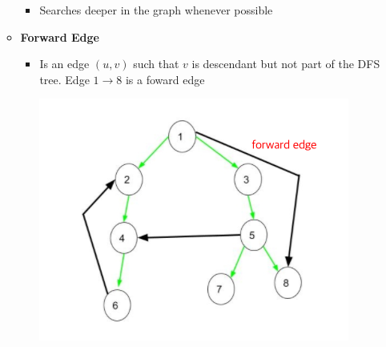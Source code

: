 \documentclass[12pt]{article}
\begin{document}
\begin{enumerate}[1.]
\begin{itemize}
        \begin{itemize}
            \item Searches deeper in the graph whenever possible
        \end{itemize}

        \item \textbf{Forward Edge}

        \begin{itemize}
            \item Is an edge $(u,v)$ such that $v$ is descendant but not part of
            the DFS tree. Edge $1 \to 8$ is a foward edge

            \begin{center}
            \includegraphics[width=0.6\linewidth]{images/worksheet_4_solution_23.png}
            \end{center}
         \end{itemize}
    \end{itemize}


\end{enumerate}
\end{document}
